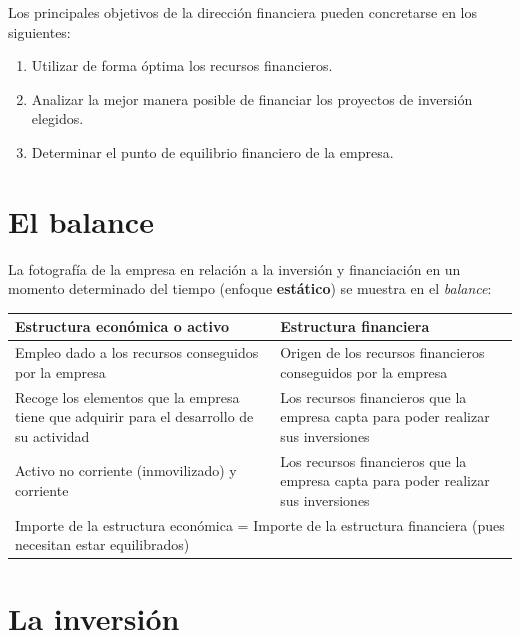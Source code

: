 \documentclass[10pt,a4paper,spanish]{report}
\begin{document}
        Los principales objetivos de la dirección financiera pueden concretarse en los siguientes:
        \begin{enumerate}
            \item Utilizar de forma óptima los recursos financieros.
            \item Analizar la mejor manera posible de financiar los proyectos de inversión elegidos.
            \item Determinar el punto de equilibrio financiero de la empresa.
        \end{enumerate}

    \section{\textcolor[rgb]{0.4,0.7,0.4}El balance}

        La fotografía de la empresa en relación a la inversión y financiación en un momento determinado del tiempo (enfoque \textbf{estático}) se muestra en el \textit{\textcolor[rgb]{0.4,0.7,0.4}{balance}}:
        \begin{center}
            \begin{tabular}{|p{4cm}|p{4cm}|}
                \hline
                \rowcolor[rgb]{0.4,0.7,0.4} \textbf{Estructura económica o activo} & \textbf{Estructura financiera} \\
                \hline
                Empleo dado a los recursos conseguidos por la empresa & Origen de los recursos financieros conseguidos por la empresa \\
                \hline
                Recoge los elementos que la empresa tiene que adquirir para el desarrollo de su actividad & Los recursos financieros que la empresa capta para poder realizar sus inversiones \\
                \hline
                Activo no corriente (inmovilizado) y corriente & Los recursos financieros que la empresa capta para poder realizar sus inversiones \\
                \hline
                \hline
                \multicolumn{2}{|p{8cm}|}{Importe de la estructura económica = Importe de la estructura financiera (pues necesitan estar equilibrados)} \\
                \hline
                \end{tabular}
            \end{center}

    \section{\textcolor[rgb]{0.4,0.7,0.4}La inversión}
\end{document}
